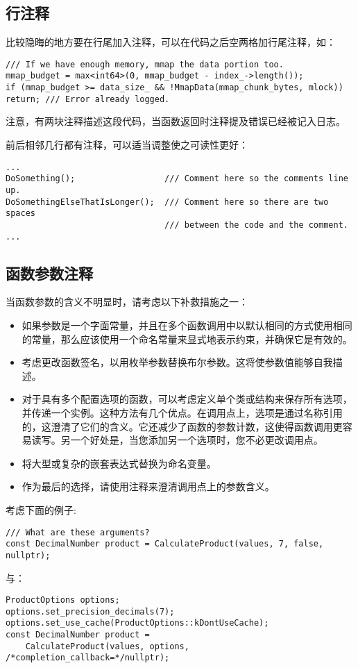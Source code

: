 \subsection{行注释}
比较隐晦的地方要在行尾加入注释，可以在代码之后空两格加行尾注释，如：
\begin{verbatim}
/// If we have enough memory, mmap the data portion too.
mmap_budget = max<int64>(0, mmap_budget - index_->length());
if (mmap_budget >= data_size_ && !MmapData(mmap_chunk_bytes, mlock))
return; /// Error already logged.
\end{verbatim}

注意，有两块注释描述这段代码，当函数返回时注释提及错误已经被记入日志。

前后相邻几行都有注释，可以适当调整使之可读性更好：
\begin{verbatim}
...
DoSomething();                  /// Comment here so the comments line up.
DoSomethingElseThatIsLonger();  /// Comment here so there are two spaces
                                /// between the code and the comment.
...
\end{verbatim}


\subsection{函数参数注释}
当函数参数的含义不明显时，请考虑以下补救措施之一：
\begin{itemize}
\item 如果参数是一个字面常量，并且在多个函数调用中以默认相同的方式使用相同的常量，那么应该使用一个命名常量来显式地表示约束，并确保它是有效的。
\item 考虑更改函数签名，以用枚举参数替换布尔参数。这将使参数值能够自我描述。
\item 对于具有多个配置选项的函数，可以考虑定义单个类或结构来保存所有选项，并传递一个实例。这种方法有几个优点。在调用点上，选项是通过名称引用的，这澄清了它们的含义。它还减少了函数的参数计数，这使得函数调用更容易读写。另一个好处是，当您添加另一个选项时，您不必更改调用点。
\item 将大型或复杂的嵌套表达式替换为命名变量。
\item 作为最后的选择，请使用注释来澄清调用点上的参数含义。
\end{itemize}

考虑下面的例子:
\begin{verbatim}
/// What are these arguments?
const DecimalNumber product = CalculateProduct(values, 7, false, nullptr);
\end{verbatim}
与：
\begin{verbatim}
ProductOptions options;
options.set_precision_decimals(7);
options.set_use_cache(ProductOptions::kDontUseCache);
const DecimalNumber product =
    CalculateProduct(values, options, /*completion_callback=*/nullptr);
\end{verbatim}



